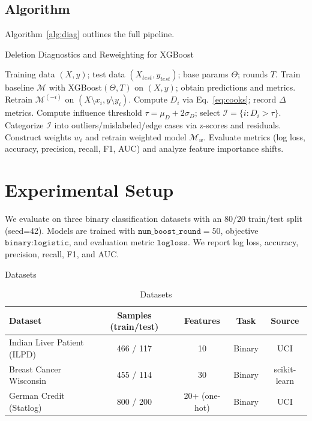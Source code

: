 \documentclass[sn-basic]{sn-jnl} %
\begin{document}
\subsection{Algorithm}
Algorithm~\ref{alg:diag} outlines the full pipeline.

\begin{algorithm}[H]
\caption{Deletion Diagnostics and Reweighting for XGBoost}
\label{alg:diag}
\begin{algorithmic}[1]
\Require Training data $(X, y)$; test data $(X_{test}, y_{test})$; base params $\Theta$; rounds $T$.
\State Train baseline $\mathcal{M}$ with XGBoost$(\Theta, T)$ on $(X,y)$; obtain predictions and metrics.
  \State Retrain $\mathcal{M}^{(-i)}$ on $(X\setminus x_i, y\setminus y_i)$.
  \State Compute $D_i$ via Eq.~\eqref{eq:cooks}; record $\Delta$metrics.
\EndFor
\State Compute influence threshold $\tau=\mu_D+2\sigma_D$; select $\mathcal{I}=\{i: D_i>\tau\}$.
\State Categorize $\mathcal{I}$ into outliers/mislabeled/edge cases via z-scores and residuals.
\State Construct weights $w_i$ and retrain weighted model $\mathcal{M}_w$.
\State Evaluate metrics (log loss, accuracy, precision, recall, F1, AUC) and analyze feature importance shifts.
\end{algorithmic}
\end{algorithm}

\section{Experimental Setup}
We evaluate on three binary classification datasets with an 80/20 train/test split (seed=42). Models are trained with $\texttt{num\_boost\_round}=50$, objective $\texttt{binary:logistic}$, and evaluation metric $\texttt{logloss}$. We report log loss, accuracy, precision, recall, F1, and AUC.

\begin{table}[H]
\caption{Datasets}
\label{tab:datasets}
\centering
\centering

\caption{Datasets}
\label{tab:datasets}
\begin{tabular}{lcccc}
\toprule
Dataset & Samples (train/test) & Features & Task & Source \\
\midrule
Indian Liver Patient (ILPD) & 466 / 117 & 10 & Binary & UCI \\
Breast Cancer Wisconsin & 455 / 114 & 30 & Binary & scikit-learn \\
German Credit (Statlog) & 800 / 200 & 20+ (one-hot) & Binary & UCI \\
\bottomrule
\end{tabular}
\end{table}
\end{document}
